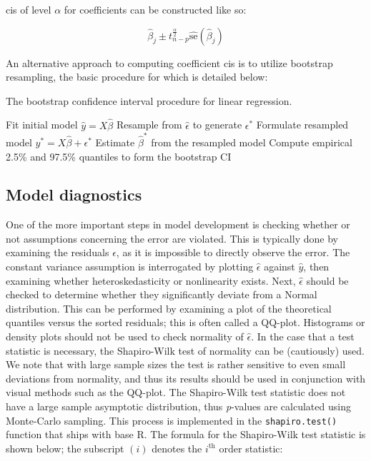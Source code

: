 \documentclass{report}
\begin{document}
\Glspl{ci} of level $\alpha$ for coefficients can be constructed like so:

\begin{equation}\label{eq:ols-beta-confidence-interval}
    \hat{\beta}_j \pm t^{\frac{\alpha}{2}}_{n-p} \widehat{\text{se}}\left(\hat{\beta}_j\right)
\end{equation}

An alternative approach to computing coefficient \glspl{ci} is to utilize bootstrap resampling, the basic procedure for which is detailed below:

\begin{algorithm}[h!]
    \caption{The bootstrap confidence interval procedure for linear regression.}\label{alg:linearBS}
    \begin{algorithmic}[1]
        \STATE Fit initial model $\hat{y} = X \hat{\beta}$
            \STATE Resample from $\hat{\epsilon}$ to generate $\epsilon^*$
            \STATE Formulate resampled model $y^* = X \hat{\beta} + \epsilon^*$
            \STATE Estimate $\hat{\beta}^*$ from the resampled model
        \ENDFOR
    \STATE Compute empirical 2.5\% and 97.5\% quantiles to form the bootstrap CI
    \end{algorithmic}
\end{algorithm}

\subsection{Model diagnostics}

One of the more important steps in model development is checking whether or not assumptions concerning the error are violated. This is typically done by examining the residuals $\hat{\epsilon}$, as it is impossible to directly observe the error. The constant variance assumption is interrogated by plotting $\hat{\epsilon}$ against $\hat{y}$, then examining whether heteroskedasticity or nonlinearity exists. Next, $\hat{\epsilon}$ should be checked to determine whether they significantly deviate from a Normal distribution. This can be performed by examining a plot of the theoretical quantiles versus the sorted residuals; this is often called a QQ-plot. Histograms or density plots should not be used to check normality of $\hat{\epsilon}$. In the case that a test statistic is necessary, the Shapiro-Wilk test of normality can be (cautiously) used. We note that with large sample sizes the test is rather sensitive to even small deviations from normality, and thus its results should be used in conjunction with visual methods such as the QQ-plot. The Shapiro-Wilk test statistic does not have a large sample asymptotic distribution, thus \textit{p}-values are calculated using Monte-Carlo sampling. This process is implemented in the \texttt{shapiro.test()} function that ships with base R. The formula for the Shapiro-Wilk test statistic is shown below; the subscript $(i)$ denotes the $i^{\text{th}}$ order statistic:
\end{document}
